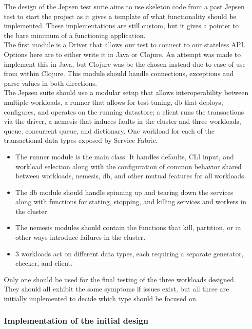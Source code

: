 \documentclass[a4paper,10pt,titlepage]{report}
\begin{document}
    The design of the Jepsen test suite aims to use skeleton code from a past Jepsen test to start the project as it gives a template of what functionality should be implemented. These implementations are still custom, but it gives a pointer to the bare minimum of a functioning application.
    \\
    The first module is a Driver that allows our test to connect to our stateless API. Options here are to either write it in Java or Clojure. An attempt was made to implement this in Java, but Clojure was be the chosen instead due to ease of use from within Clojure. This module should handle connections, exceptions and parse values in both directions.
    \\
    The Jepsen suite should use a modular setup that allows interoperability between multiple workloads, a runner that allows for test tuning, db that deploys, configures, and operates on the running datastore; a client runs the transactions via the driver, a nemesis that induces faults in the cluster and three workloads, queue, concurrent queue, and dictionary. One workload for each of the transactional data types exposed by Service Fabric.
    \begin{itemize}
        \item The runner module is the main class. It handles defaults, CLI input, and workload selection along with the configuration of common behavior shared between workloads, nemesis, db, and other mutual features for all workloads.
        \item   The db module should handle spinning up and tearing down the services along with functions for stating, stopping, and killing services and workers in the cluster.

  \item  The nemesis modules should contain the functions that kill, partition, or in other ways introduce failures in the cluster.

  \item 3 workloads act on different data types, each requiring a separate generator, checker, and client.
    \end{itemize}
    
    Only one should be used for the final testing of the three workloads designed. They should all exhibit the same symptoms if issues exist, but all three are initially implemented to decide which type should be focused on.
    

  
\subsubsection{Implementation of the initial design}
\end{document}
